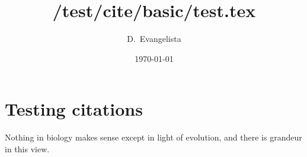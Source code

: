 \documentclass{article}
\title{/test/cite/basic/test.tex}
\author{D.~Evangelista}
\date{\today}
\begin{document}
\maketitle

\section{Testing citations}
Nothing in biology makes sense except in light of evolution, and there is grandeur in this view\cite{dobzhansky:1973:nothing,darwin:1859:origin}. 



\end{document}
